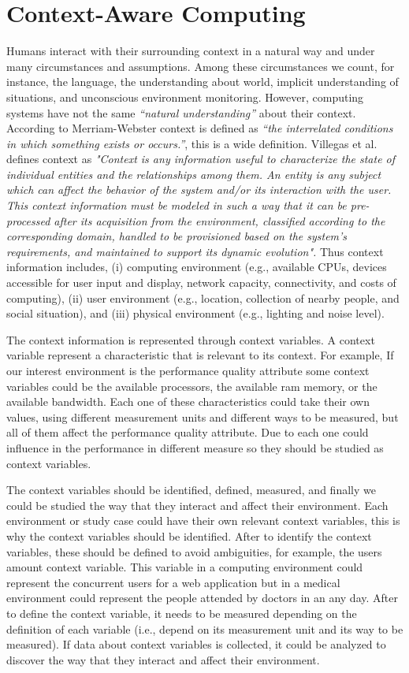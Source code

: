 \section {Context-Aware Computing}
\label{subsec:contextaware}
Humans interact with their surrounding context in a natural way and under many circumstances and assumptions. Among these circumstances we count, for instance, the language, the understanding about world, implicit understanding of situations, and unconscious environment monitoring. However, computing systems have not the same \textit{``natural understanding''} about their context. According to Merriam-Webster context is defined as \textit{``the interrelated conditions in which something exists or occurs.''}, this is a wide definition. Villegas et al. \cite{villegas2013context} defines context as \textit{"Context is any information useful to characterize the state of individual entities and the relationships among them. An entity is any subject which can affect the behavior of the system and/or its interaction with the user. This context information must be modeled in such a way that it can be pre-processed after its acquisition from the environment, classified according to the corresponding domain, handled to be provisioned based on the system’s requirements, and maintained to support its dynamic evolution".} Thus context information includes, (i) computing environment (e.g., available CPUs, devices accessible for user input and display, network capacity, connectivity, and costs of computing), (ii) user environment (e.g., location, collection of nearby people, and social situation), and (iii) physical environment (e.g., lighting and noise level).

The context information is represented through context variables. A context variable represent a characteristic that is relevant to its context. For example, If our interest environment is the performance quality attribute some context variables could be the available processors, the available ram memory, or the available bandwidth. Each one of these characteristics could take their own values, using different measurement units and different ways to be measured, but all of them affect the performance quality attribute. Due to each one could influence in the performance in different measure so they should be studied as context variables. 

The context variables should be identified, defined, measured, and finally we could be studied the way that they interact and affect their environment. Each environment or study case could have their own relevant context variables, this is why the context variables should be identified. After to identify the context variables, these should be defined to avoid ambiguities, for example, the users amount context variable. This variable in a computing environment could represent the concurrent users for a web application but in a medical environment could represent the people attended by doctors in an any day. After to define the context variable, it needs to be measured depending on the definition of each variable (i.e., depend on its measurement unit and its way to be measured). If data about context variables is collected, it could be analyzed to discover the way that they interact and affect their environment.

